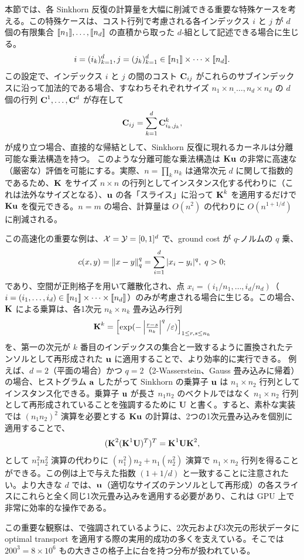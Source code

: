 \begin{rem}[分離可能カーネルによる高速化]\label{rem-separable} 本節では、各 Sinkhorn 反復の計算量を大幅に削減できる重要な特殊ケースを考える。この特殊ケースは、コスト行列で考慮される各インデックス $i$ と $j$ が $d$ 個の有限集合 $\llbracket n_1\rrbracket,\dots,\llbracket n_d\rrbracket$ の直積から取った $d$-組として記述できる場合に生じる。
$$i=(i_k)_{k=1}^d, j=(j_k)_{k=1}^d \in \llbracket n_1\rrbracket\times\dots\times\llbracket n_d\rrbracket.$$
この設定で、インデックス $i$ と $j$ の間のコスト $\mathrm{\textbf{C}}_{ij}$ がこれらのサブインデックスに沿って加法的である場合、すなわちそれぞれサイズ $n_1\times n_,\dots,n_d\times n_d$ の $d$ 個の行列 $\mathrm{\textbf{C}}^1,\dots,\mathrm{\textbf{C}}^d$ が存在して
$$\mathrm{\textbf{C}}_{ij} = \sum_{k=1}^d \mathrm{\textbf{C}}^k_{i_k,j_k},$$
が成り立つ場合、直接的な帰結として、Sinkhorn 反復に現れるカーネルは分離可能な乗法構造を持つ。
このような分離可能な乗法構造は $\mathrm{\textbf{K}} \mathrm{\textbf{u}}$ の非常に高速な（厳密な）評価を可能にする。実際、$n=\prod_k n_k$ は通常次元 $d$ に関して指数的であるため、$\mathrm{\textbf{K}}$ をサイズ $n\times n$ の行列としてインスタンス化する代わりに（これは法外なサイズとなる）、$\mathrm{\textbf{u}}$ の各「スライス」に沿って $\mathrm{\textbf{K}}^k$ を適用するだけで $\mathrm{\textbf{K}}\mathrm{\textbf{u}}$ を復元できる。$n=m$ の場合、計算量は $O(n^2)$ の代わりに $O(n^{1+1/d})$ に削減される。

この高速化の重要な例は、$\mathcal{X}=\mathcal{Y}=[0,1]^d$ で、ground cost が $q$-ノルムの $q$ 乗、$$c(x,y)=\left\| x-y \right\|^q_q=\sum_{i=1}^d |x_i-y_i|^q, \; q>0;$$ であり、空間が正則格子を用いて離散化され、点 $x_i = (i_1/n_1,\ldots,i_d/n_d)$（$i=(i_1,\dots,i_d)\in\llbracket n_1\rrbracket\times \dots\times\llbracket n_d\rrbracket$）のみが考慮される場合に生じる。この場合、$\mathrm{\textbf{K}}$ による乗算は、各1次元 $n_k\times n_k$ 畳み込み行列 $$\mathrm{\textbf{K}}^k = \begin{bmatrix}\exp(-\left|\frac{r-s}{n_k}\right|^q/ \varepsilon)\end{bmatrix}_{1 \leq r,s\leq n_k}$$ を、第一の次元が $k$ 番目のインデックスの集合と一致するように置換されたテンソルとして再形成された $\mathrm{\textbf{u}}$ に適用することで、より効率的に実行できる。
例えば、$d=2$（平面の場合）かつ $q=2$（2-Wasserstein、Gauss 畳み込みに帰着）の場合、ヒストグラム $\mathrm{\textbf{a}}$ したがって Sinkhorn の乗算子 $\mathrm{\textbf{u}}$ は $n_1\times n_2$ 行列としてインスタンス化できる。乗算子 $\mathrm{\textbf{u}}$ が長さ $n_1n_2$ のベクトルではなく $n_1\times n_2$ 行列として再形成されていることを強調するために $\mathbf{U}$ と書く。すると、素朴な実装では $(n_1 n_2)^2$ 演算を必要とする $\mathrm{\textbf{K}}\mathrm{\textbf{u}}$ の計算は、2つの1次元畳み込みを個別に適用することで、$$(\mathrm{\textbf{K}}^2(\mathrm{\textbf{K}}^1 \mathbf{U})^T)^T=\mathrm{\textbf{K}}^1\mathbf{U}\mathrm{\textbf{K}}^2,$$ として $n_1^2n_2^2$ 演算の代わりに $(n_1^2)n_2+n_1(n_2^2)$ 演算で $n_1\times n_2$ 行列を得ることができる。この例は上で与えた指数 $(1+1/d)$ と一致することに注意されたい。より大きな $d$ では、$\mathrm{\textbf{u}}$（適切なサイズのテンソルとして再形成）の各スライスにこれらと全く同じ1次元畳み込みを適用する必要があり、これは GPU 上で非常に効率的な操作である。

この重要な観察は、\citep{2015-solomon-siggraph,2016-bonneel-barycoord}で強調されているように、2次元および3次元の形状データに optimal transport を適用する際の実用的成功の多くを支えている。そこでは $200^3=8 \times 10^6$ もの大きさの格子上に台を持つ分布が扱われている。
\end{rem}


